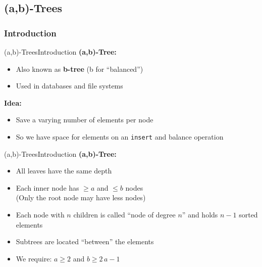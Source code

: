 \subsection{(a,b)-Trees}
\subsubsection{Introduction}

\begin{frame}{(a,b)-Trees}{Introduction}
  \textbf{(a,b)-Tree:}
  \begin{itemize}
    \item<2->
      Also known as \textbf{b-tree} (b for \enquote{balanced})
    \item<3->
      Used in databases and file systems
  \end{itemize}
  \textbf{Idea:}
  \begin{itemize}
    \item<5->
      Save a varying number of elements per node
    \item<6->
      So we have space for elements on an \texttt{\color{MainA}insert}
      and balance operation
  \end{itemize}
\end{frame}


\begin{frame}{(a,b)-Trees}{Introduction}
  \textbf{(a,b)-Tree:}
  \begin{itemize}
    \item<2->
      All leaves have the same depth
    \item<3->
      Each inner node has {\color{MainA}$\geq a$} and
      {\color{MainA}$\leq b$} nodes\\
      (Only the root node may have less nodes)
  \end{itemize}
  \begin{figure}
    \begin{adjustbox}{width=0.3\linewidth}
      
    \end{adjustbox}
    \label{fig:a_b_tree:node_introduction}
  \end{figure}
    \begin{itemize}
    \item<5->
      Each node with {\color{MainA}$n$} children is called \enquote{node of degree $n$} and
      holds {\color{MainA}$n-1$} sorted elements
    \item<6->
      Subtrees are located \enquote{between} the elements
    \item<7->
      We require: {\color{MainA}$a \geq 2$} and
      {\color{MainA}$b \geq 2\,a - 1$}
  \end{itemize}
\end{frame}

